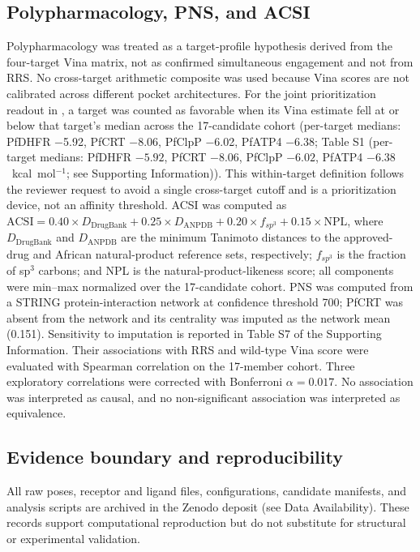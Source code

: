 \documentclass[11pt,a4paper]{article}
\begin{document}
	\subsection{Polypharmacology, PNS, and ACSI}\label{sec:methods_pns}
	Polypharmacology was treated as a target-profile hypothesis derived from the four-target Vina matrix, not as confirmed simultaneous engagement and not from RRS. No cross-target arithmetic composite was used because Vina scores are not calibrated across different pocket architectures. For the joint prioritization readout in , a target was counted as favorable when its Vina estimate fell at or below that target's median across the \num{17}-candidate cohort (per-target medians: PfDHFR \num{-5.92}, PfCRT \num{-8.06}, PfClpP \num{-6.02}, PfATP4 \num{-6.38}; Table S1 (per-target medians: PfDHFR $-5.92$, PfCRT $-8.06$, PfClpP $-6.02$, PfATP4 $-6.38$~kcal~mol$^{-1}$; see Supporting Information)). This within-target definition follows the reviewer request to avoid a single cross-target cutoff and is a prioritization device, not an affinity threshold. ACSI was computed as $\mathrm{ACSI}=\num{0.40}\times D_{\mathrm{DrugBank}}+\num{0.25}\times D_{\mathrm{ANPDB}}+\num{0.20}\times f_{sp^3}+\num{0.15}\times\mathrm{NPL}$, where $D_{\mathrm{DrugBank}}$ and $D_{\mathrm{ANPDB}}$ are the minimum Tanimoto distances to the approved-drug and African natural-product reference sets, respectively; $f_{sp^3}$ is the fraction of sp$^3$ carbons; and NPL is the natural-product-likeness score; all components were min--max normalized over the 17-candidate cohort. PNS was computed from a STRING protein-interaction network at confidence threshold \num{700}; PfCRT was absent from the network and its centrality was imputed as the network mean (\num{0.151}). Sensitivity to imputation is reported in Table S7 of the Supporting Information. Their associations with RRS and wild-type Vina score were evaluated with Spearman correlation on the 17-member cohort. Three exploratory correlations were corrected with Bonferroni $\alpha=\num{0.017}$. No association was interpreted as causal, and no non-significant association was interpreted as equivalence.
	
	\subsection{Evidence boundary and reproducibility}\label{sec:methods_boundary}
	All raw poses, receptor and ligand files, configurations, candidate manifests, and analysis scripts are archived in the Zenodo deposit (see Data Availability). These records support computational reproduction but do not substitute for structural or experimental validation.
	
\end{document}
